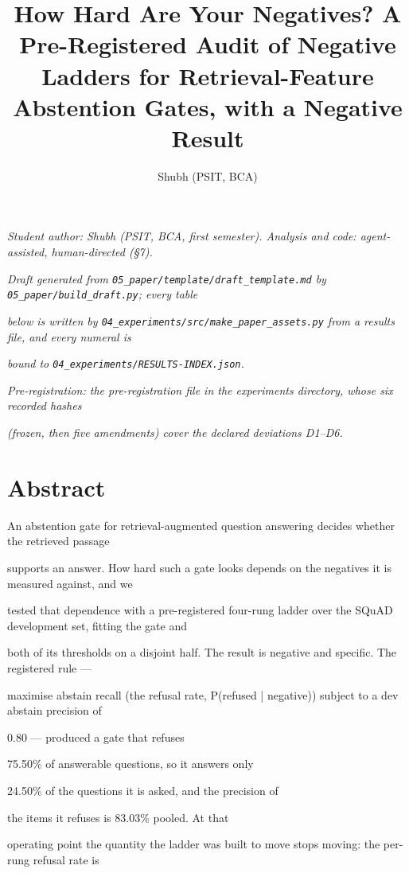 \title{How Hard Are Your Negatives? A Pre-Registered Audit of Negative Ladders for Retrieval-Feature Abstention Gates, with a Negative Result}
\author{Shubh (PSIT, BCA)}
\date{}
\maketitle
\textit{Student author: Shubh (PSIT, BCA, first semester). Analysis and code: agent-assisted, human-directed (§7).}

\textit{Draft generated from \texttt{05\_paper/\allowbreak{}template/\allowbreak{}draft\_template.md} by \texttt{05\_paper/\allowbreak{}build\_draft.py}; every table}

\textit{below is written by \texttt{04\_experiments/\allowbreak{}src/\allowbreak{}make\_paper\_assets.py} from a results file, and every numeral is}

\textit{bound to \texttt{04\_experiments/\allowbreak{}RESULTS-INDEX.json}.}

\textit{Pre-registration: the pre-registration file in the experiments directory, whose six recorded hashes}

\textit{(frozen, then five amendments) cover the declared deviations D1--D6.}

\section{Abstract}
An abstention gate for retrieval-augmented question answering decides whether the retrieved passage

supports an answer. How hard such a gate looks depends on the negatives it is measured against, and we

tested that dependence with a pre-registered four-rung ladder over the SQuAD development set, fitting the gate and

both of its thresholds on a disjoint half. The result is negative and specific. The registered rule ---

maximise abstain recall (the refusal rate, P(refused | negative)) subject to a dev abstain precision of

0.80 --- produced a gate that refuses

75.50\% of answerable questions, so it answers only

24.50\% of the questions it is asked, and the precision of

the items it refuses is 83.03\% pooled. At that

operating point the quantity the ladder was built to move stops moving: the per-rung refusal rate is

